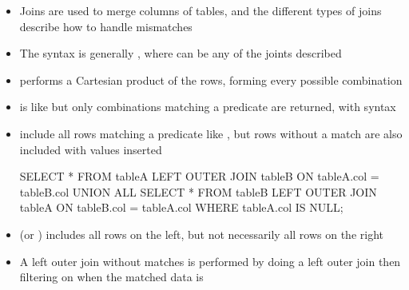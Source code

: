 \documentclass[a4paper]{article}
\begin{document}
\begin{itemize}
    \item Joins are used to merge columns of tables, and the different types of joins describe how to handle mismatches
    \item The syntax is generally , where  can be any of the joints described
    \item {} performs a Cartesian product of the rows, forming every possible combination
    \item {} is like  but only combinations matching a predicate are returned, with syntax 
    \item {} include all rows matching a predicate like , but rows without a match are also included with  values inserted
\begin{sql}
SELECT * FROM tableA
LEFT OUTER JOIN tableB
ON tableA.col = tableB.col
UNION ALL
SELECT * FROM tableB
LEFT OUTER JOIN tableA
ON tableB.col = tableA.col
WHERE tableA.col IS NULL;
\end{sql}
    \item {} (or ) includes all rows on the left, but not necessarily all rows on the right
    \item A left outer join without matches is performed by doing a left outer join then filtering on when the matched data is 

\end{itemize}
\end{document}
